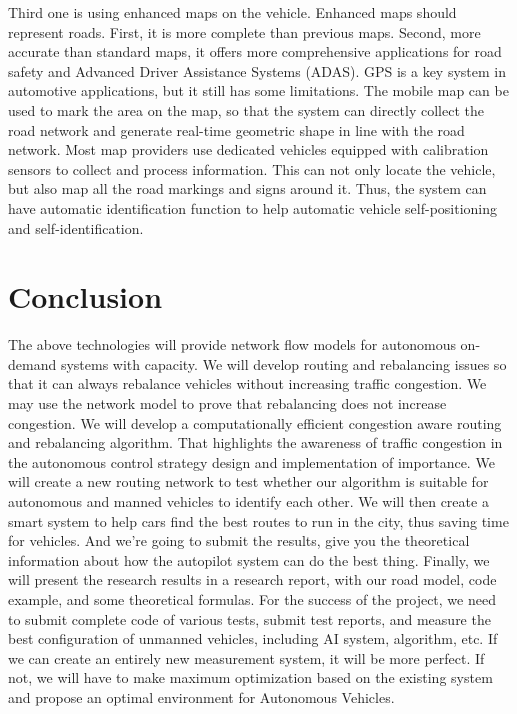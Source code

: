 \documentclass[letterpaper,10pt,draftclsnofoot,onecolumn]{IEEEtran}
\begin{document}
Third one is using enhanced maps on the vehicle. Enhanced maps should represent roads. First, it is more complete than previous maps. Second, more accurate than standard maps, it offers more comprehensive applications for road safety and Advanced Driver Assistance Systems (ADAS). GPS is a key system in automotive applications, but it still has some limitations. The mobile map can be used to mark the area on the map, so that the system can directly collect the road network and generate real-time geometric shape in line with the road network. Most map providers use dedicated vehicles equipped with calibration sensors to collect and process information. This can not only locate the vehicle, but also map all the road markings and signs around it. Thus, the system can have automatic identification function to help automatic vehicle self-positioning and self-identification.
                
        


	


\section{Conclusion}
The above technologies will provide network flow models for autonomous on-demand systems with capacity. We will develop routing and rebalancing issues so that it can always rebalance vehicles without increasing traffic congestion. We may use the network model to prove that rebalancing does not increase congestion. We will develop a computationally efficient congestion aware routing and rebalancing algorithm. That highlights the awareness of traffic congestion in the autonomous control strategy design and implementation of importance. We will create a new routing network to test whether our algorithm is suitable for autonomous and manned vehicles to identify each other. We will then create a smart system to help cars find the best routes to run in the city, thus saving time for vehicles. And we're going to submit the results, give you the theoretical information about how the autopilot system can do the best thing. Finally, we will present the research results in a research report, with our road model, code example, and some theoretical formulas. For the success of the project, we need to submit complete code of various tests, submit test reports, and measure the best configuration of unmanned vehicles, including AI system, algorithm, etc. If we can create an entirely new measurement system, it will be more perfect. If not, we will have to make maximum optimization based on the existing system and propose an optimal environment for Autonomous Vehicles.
\end{document}
